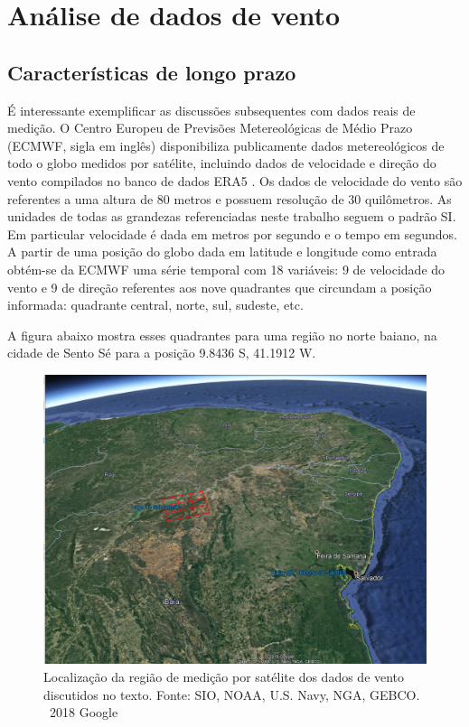 \documentclass[
	12pt,				%
	openright,			%
	oneside,			%
	a4paper,			%
	english,			%
	french,				%
	spanish,			%
	brazil				%
	]{abntex2}
\begin{document}
\cleardoublepage
\part{Análise de dados de vento}

\chapter{Características de longo prazo}

É interessante exemplificar as discussões subsequentes com dados reais de medição. O Centro Europeu de Previsões Metereológicas de Médio Prazo (ECMWF, sigla em inglês) disponibiliza publicamente dados metereológicos de todo o globo medidos por satélite, incluindo dados de velocidade e direção do vento compilados no banco de dados ERA5 \cite{era5}. Os dados de velocidade do vento são referentes a uma altura de 80 metros e possuem resolução de 30 quilômetros. As unidades de todas as grandezas referenciadas neste trabalho seguem o padrão SI. Em particular velocidade é dada em metros por segundo e o tempo em segundos. A partir de uma posição do globo dada em latitude e longitude como entrada obtém-se da ECMWF uma série temporal com 18 variáveis: 9 de velocidade do vento e 9 de direção referentes aos nove quadrantes que circundam a posição informada: quadrante central, norte, sul, sudeste, etc. 

A figura abaixo mostra esses quadrantes para uma região no norte baiano, na cidade de Sento Sé para a posição 9.8436 S, 41.1912 W.

\begin{figure}[h]
    \centering
	\includegraphics[scale=0.6]{earth}
	\caption{Localização da região de medição por satélite dos dados de vento discutidos no texto. Fonte: SIO, NOAA, U.S. Navy, NGA, GEBCO. \textcopyright \  2018 Google}
\end{figure}
\FloatBarrier
\end{document}
